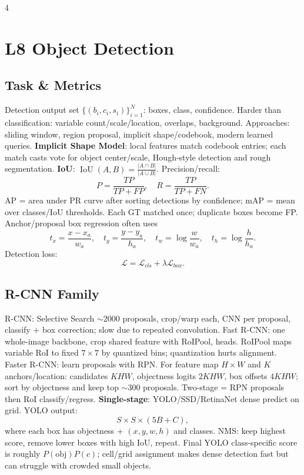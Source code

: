 \documentclass[8pt,a4paper,landscape]{extarticle}
\newcommand{\key}[1]{\textbf{#1}}
\DeclareMathOperator{\IoU}{IoU}
\begin{document}
\begin{multicols*}{4}
\section{L8 Object Detection}
\subsection{Task \& Metrics}
Detection output set $\{(b_i,c_i,s_i)\}_{i=1}^N$: boxes, class, confidence. Harder than classification: variable count/scale/location, overlaps, background. Approaches: sliding window, region proposal, implicit shape/codebook, modern learned queries. \key{Implicit Shape Model}: local features match codebook entries; each match casts vote for object center/scale, Hough-style detection and rough segmentation.
\key{IoU}: $\IoU(A,B)=\frac{|A\cap B|}{|A\cup B|}$. Precision/recall:
\[
P=\frac{TP}{TP+FP},\quad R=\frac{TP}{TP+FN}.
\]
AP = area under PR curve after sorting detections by confidence; mAP = mean over classes/IoU thresholds. Each GT matched once; duplicate boxes become FP. Anchor/proposal box regression often uses
\[
t_x=\frac{x-x_a}{w_a},\quad t_y=\frac{y-y_a}{h_a},\quad t_w=\log\frac{w}{w_a},\quad t_h=\log\frac{h}{h_a}.
\]
Detection loss:
\[
\mathcal L=\mathcal L_{cls}+\lambda\mathcal L_{box}.
\]

\subsection{R-CNN Family}
R-CNN: Selective Search $\sim2000$ proposals, crop/warp each, CNN per proposal, classify + box correction; slow due to repeated convolution. Fast R-CNN: one whole-image backbone, crop shared feature with RoIPool, heads. RoIPool maps variable RoI to fixed $7\times7$ by quantized bins; quantization hurts alignment. Faster R-CNN: learn proposals with RPN. For feature map $H\times W$ and $K$ anchors/location: candidates $KHW$, objectness logits $2KHW$, box offsets $4KHW$; sort by objectness and keep top $\sim300$ proposals. Two-stage = RPN proposals then RoI classify/regress.
\key{Single-stage}: YOLO/SSD/RetinaNet dense predict on grid. YOLO output:
\[
S\times S\times(5B+C),
\]
where each box has objectness + $(x,y,w,h)$ and classes. NMS: keep highest score, remove lower boxes with high IoU, repeat.
Final YOLO class-specific score is roughly $P(\mathrm{obj})P(c)$; cell/grid assignment makes dense detection fast but can struggle with crowded small objects.


\end{multicols*}
\end{document}
